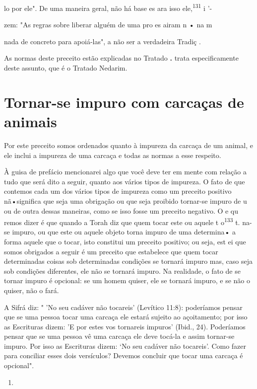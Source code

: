\begin{itemize}
\begin{enumrate}
\begin{itemize}
\begin{itemize}
lo por ele". De uma maneira geral, não há base es ara isso
ele,\textsuperscript{131} i '-

zem: "As regras sobre liberar alguém de uma pro es airam n • na m

nada de concreto para apoiá-las", a não ser a verdadeira Tradiç .

As normas deste preceito estão explicadas no Tratado
\textbf{.} trata es­pecificamente deste assunto, que é
o Tratado Nedarim.

\section{Tornar-se impuro com carcaças de animais}

Por este preceito somos ordenados quanto à impureza da carcaça de um
animal, e ele inclui a impureza de uma carcaça e todas as normas a esse
respeito.

À guisa de prefácio mencionarei algo que você deve ter em mente com
relação a tudo que será dito a seguir, quanto aos vários tipos de
impureza. O fato de que contemos cada um dos vários tipos de impureza
como um pre­ceito positivo nã•significa que seja uma obrigação ou que
seja proibido tornar-se impuro de u ou de outra dessas maneiras, como se
isso fosse um preceito negativo. O e qu remos dizer é que quando a Torah
diz que quem tocar este ou aquele t o\textsuperscript{133} t. na-se
impuro, ou que este ou aquele objeto torna impuro de uma determina• a
forma aquele que o tocar, isto constitui um preceito posi­tivo; ou seja,
est ei que somos obrigados a seguir é um preceito que estabele­ce que
quem tocar determinadas coisas sob determinadas condições se tornará
impuro mas, caso seja sob condições diferentes, ele não se tornará
impuro. Na realidade, o fato de se tornar impuro é opcional: se um homem
quiser, ele se tornará impuro, e se não o quiser, não o fará.

A Sifrá diz: " 'No seu cadáver não tocareis' (Levítico 11:8):
podería­mos pensar que se uma pessoa tocar uma carcaça ele estará
sujeito ao açoita­mento; por isso as Escrituras dizem: 'E por estes vos
tornareis impuros' (Ibid., 24). Poderíamos pensar que se uma pessoa vê
uma carcaça ele deve tocá-la e assim tornar-se impuro. Por isso as
Escrituras dizem: `No seu cadáver não toca­reis'. Como fazer para
conciliar esses dois versículos? Devemos concluir que tocar uma carcaça
é opcional".


\begin{enumerate}
\def\labelenumi{\arabic{enumi}.}
\setcounter{enumi}{128}
\item
 

\end{enumerate}
\end{itemize}
\end{itemize}
\end{enumrate}
\end{itemize}
